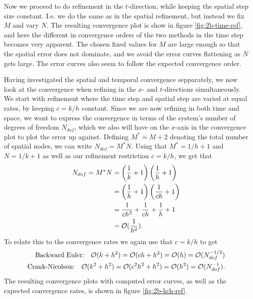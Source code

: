Now we proceed to do refinement in the $t$-direction, 
while keeping the spatial step size constant. 
I.e. we do the same as in the spatial refinement, 
but instead we fix $M$ and vary $N$. 
The resulting convergence plot is show in figure \ref{fig:2b-time-ref}, 
and here the different in convergence orders of the two methods in the time step becomes very apparent. 
The chosen fixed values for $M$ are large enough so that the spatial error does not dominate, 
and we avoid the error curves flattening as $N$ gets large. 
The error curves also seem to follow the expected convergence order. 

Having investigated the spatial and temporal convergence sepparately, 
we now look at the convergence when refining in the $x$- and $t$-directions simultaneously. 
We start with refinement where the time step and spatial step are varied at equal rates, 
by keeping $c = k/h$ constant. 
Since we are now refining in both time and space, 
we want to express the convergence in terms of the system's number of degrees of freedom $N_{dof}$, 
which we also will have on the $x$-axis in the convergence plot to plot the error up against. 
Defining $M^* = M+2$ denoting the total number of spatial nodes, 
we can write $N_{dof} = M^*N$. 
Using that $M^*=1/h+1$ and $N=1/k+1$ as well as our refinement restriction $c = k/h$, we get that 
\begin{equation*}
\begin{split}
    N_{dof} = M^* N & = \left(\frac{1}{k}+1\right)\left(\frac{1}{h}+1\right)
    \\ & = \left(\frac{1}{h}+1\right)\left(\frac{1}{ch}+1\right)
    \\ & = \frac{1}{ch^2} + \frac{1}{ch} + \frac{1}{h} + 1 
    \\ & = \mathcal{O}(\frac{1}{h^2}).
\end{split}
\end{equation*}
To relate this to the convergence rates we again use that $c=k/h$ to get 
\begin{equation*}
\begin{split}
    \text{Backward Euler:} \quad \mathcal{O}(k+h^2) = \mathcal{O}(ch+h^2) = \mathcal{O}(h) = \mathcal{O}(N_{dof}^{-1/2})\\
    \text{Crank-Nicolson:} \quad \mathcal{O}(k^2+h^2) = \mathcal{O}(c^2 h^2+h^2) = \mathcal{O}(h^2) = \mathcal{O}(N_{dof}^{-1}). 
\end{split}
\end{equation*}
The resulting convergence plots with computed error curves, 
as well as the expected convergence rates,
is shown in figure \ref{fig:2b-kch-ref}. 
